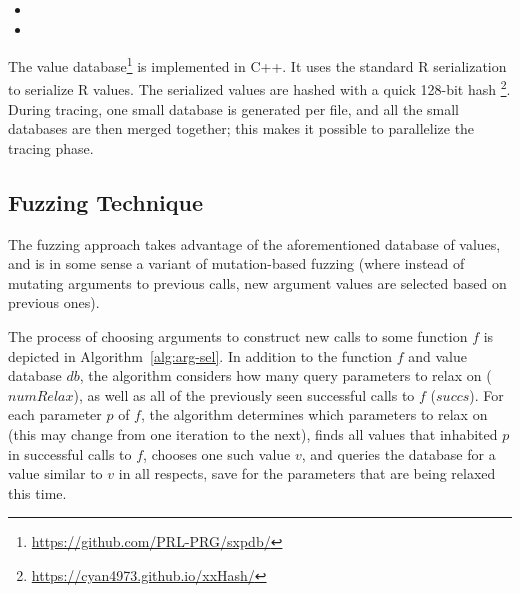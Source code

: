 \documentclass[sigplan,anonymous,review]{acmart}
\begin{document}
\begin{itemize}
    \item {}
    \item {}
\end{itemize}

The value database\footnote{\url{https://github.com/PRL-PRG/sxpdb/}  } is implemented in C++. 
It uses the standard R serialization to serialize R values. 
The serialized values are hashed with a quick 128-bit hash \footnote{\url{https://cyan4973.github.io/xxHash/}}. 
During tracing, one small database is generated per file, and all the small databases are then merged together; this makes it possible to parallelize the tracing phase.

\subsection{Fuzzing Technique}


The fuzzing approach takes advantage of the aforementioned database of values, and is in some sense a variant of mutation-based fuzzing (where instead of mutating arguments to previous calls, new argument values are selected based on previous ones).

The process of choosing arguments to construct new calls to some function $f$ is depicted in Algorithm~\ref{alg:arg-sel}.
In addition to the function $f$ and value database $db$, the algorithm considers how many query parameters to relax on ($numRelax$), as well as all of the previously seen successful calls to $f$ ($succs$).
For each parameter $p$ of $f$, the algorithm determines which parameters to relax on (this may change from one iteration to the next), finds all values that inhabited $p$ in successful calls to $f$, chooses one such value $v$, and queries the database for a value similar to $v$ in all respects, save for the parameters that are being relaxed this time.
\end{document}
